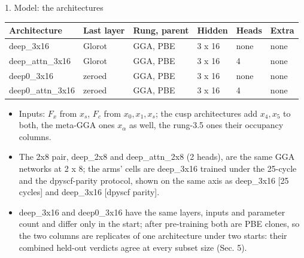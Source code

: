 \begin{frame}[label=f9]{1. Model: the architectures}
  \begin{center}\small
  \begin{tabular}{llllll}
  \toprule
  Architecture & Last layer & Rung, parent & Hidden & Heads & Extra \\ \midrule
  deep\_3x16 & Glorot & GGA, PBE & 3 x 16 & none & none \\
  deep\_attn\_3x16 & Glorot & GGA, PBE & 3 x 16 & 4 & none \\
  deep0\_3x16 & zeroed & GGA, PBE & 3 x 16 & none & none \\
  deep0\_attn\_3x16 & zeroed & GGA, PBE & 3 x 16 & 4 & none \\
  \bottomrule
  \end{tabular}
  \end{center}
  \small
  \begin{itemize}
    \item Inputs: $F_x$ from $x_s$, $F_c$ from $x_0, x_1, x_s$; the cusp architectures add $x_4, x_5$ to both, the meta-GGA ones $x_\alpha$ as well, the rung-3.5 ones their occupancy columns.
    \item The 2x8 pair, deep\_2x8 and deep\_attn\_2x8 (2 heads), are the same GGA networks at 2 x 8; the arms' cells are deep\_3x16 trained under the 25-cycle and the dpyscf-parity protocol, shown on the same axis as deep\_3x16 [25 cycles] and deep\_3x16 [dpyscf parity].
    \item deep\_3x16 and deep0\_3x16 have the same layers, inputs and parameter count and differ only in the start; after pre-training both are PBE clones, so the two columns are replicates of one architecture under two starts: their combined held-out verdicts agree at every subset size (Sec. 5).
  \end{itemize}
  \hfill \hyperlink{b2}{}
\end{frame}
